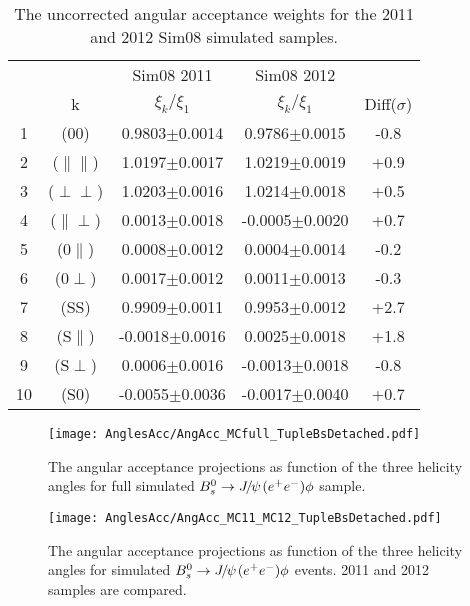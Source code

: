  \begin{table}[htb]
  \caption{
    The uncorrected angular acceptance weights for the 2011 and 2012 Sim08 simulated samples.}
    \small{
\begin{center}\begin{tabular}{ccccc}
    \hline
   & & Sim08 2011 & Sim08 2012 & \\ 
   & k & $\xi_{k}/\xi_{1}$ & $\xi_{k}/\xi_{1}$ & Diff($\sigma$) \\
    \hline
  1 & (00) & 0.9803$\pm$0.0014 &0.9786$\pm$0.0015 & -0.8\\
  2 & ($\parallel\parallel$) & 1.0197$\pm$0.0017& 1.0219$\pm$0.0019 & +0.9\\
  3 & ($\perp\perp$) & 1.0203$\pm$0.0016& 1.0214$\pm$0.0018 & +0.5\\
  4 & ($\parallel\perp$) & 0.0013$\pm$0.0018& -0.0005$\pm$0.0020 & +0.7\\
  5 & (0$\parallel$) & 0.0008$\pm$0.0012& 0.0004$\pm$0.0014 & -0.2\\
  6 & (0$\perp$) & 0.0017$\pm$0.0012& 0.0011$\pm$0.0013 & -0.3\\
  7 & (SS) & 0.9909$\pm$0.0011& 0.9953$\pm$0.0012 & +2.7\\
  8 & (S$\parallel$) & -0.0018$\pm$0.0016& 0.0025$\pm$0.0018 & +1.8\\
  9 & (S$\perp$) & 0.0006$\pm$0.0016& -0.0013$\pm$0.0018 & -0.8\\
  10 & (S0) & -0.0055$\pm$0.0036& -0.0017$\pm$0.0040 & +0.7\\
  \hline
    \end{tabular}\end{center}
  }
\label{tab:UnccorrAngAcc}
\end{table}

\begin{figure}[hbt]
  \begin{center}
    \texttt{[image: AnglesAcc/AngAcc\_MCfull\_TupleBsDetached.pdf]}\\
     \vspace*{-0.5cm}
  \end{center}
    \caption{
    The angular acceptance projections as function of the three helicity angles for full simulated ${{B}^0_{s}}\rightarrow{\ensuremath{{J\mskip -3mu/\mskip -2mu\psi\mskip 2mu}}}({e^+e^-})\phi$ sample.
}
  \label{fig:AnglesAccMCfull} 
\end{figure}

\begin{figure}[hbt]
  \begin{center}
    \texttt{[image: AnglesAcc/AngAcc\_MC11\_MC12\_TupleBsDetached.pdf]}\\
     \vspace*{-0.5cm}
  \end{center}
    \caption{
    The angular acceptance projections as function of the three helicity angles for simulated ${{B}^0_{s}}\rightarrow{\ensuremath{{J\mskip -3mu/\mskip -2mu\psi\mskip 2mu}}}({e^+e^-})\phi$ events. 2011 and 2012 samples are compared.
}
\label{fig:AnglesAccMC11MC12} 
\end{figure}

